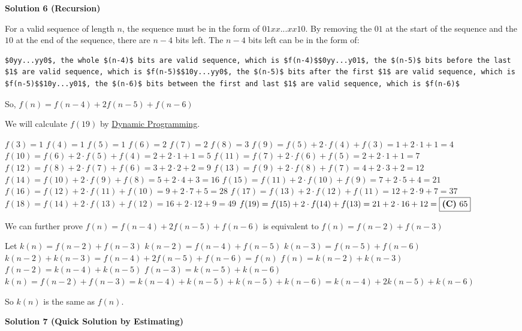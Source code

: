 \begin{enumerate}
\textbf{Solution 6 (Recursion)}

For a valid sequence of length $n$, the sequence must be in the form of $01xx...xx10$. By removing the $01$ at the start of the sequence and the $10$ at the end of the sequence, there are $n-4$ bits left. The $n-4$ bits left can be in the form of:

 \begin{verbatim}
$0yy...yy0$, the whole $(n-4)$ bits are valid sequence, which is $f(n-4)$$0yy...y01$, the $(n-5)$ bits before the last $1$ are valid sequence, which is $f(n-5)$$10y...yy0$, the $(n-5)$ bits after the first $1$ are valid sequence, which is $f(n-5)$$10y...y01$, the $(n-6)$ bits between the first and last $1$ are valid sequence, which is $f(n-6)$
\end{verbatim}

So, $f(n) = f(n-4) + 2f(n-5) + f(n-6)$

 We will calculate $f(19)$ by \href{https://en.wikipedia.org/wiki/Dynamic\_programming}{Dynamic Programming}.

 $f(3) = 1$
$f(4) = 1$
$f(5) = 1$
$f(6) = 2$
$f(7) = 2$
$f(8) = 3$
$f(9) = f(5) + 2 \cdot f(4) + f(3) = 1 + 2 \cdot 1 + 1 = 4$
$f(10) = f(6) + 2 \cdot f(5) + f(4) = 2 + 2 \cdot 1 + 1 = 5$
$f(11) = f(7) + 2 \cdot f(6) + f(5) = 2 + 2 \cdot 1 + 1 = 7$
$f(12) = f(8) + 2 \cdot f(7) + f(6) = 3 + 2 \cdot 2 + 2 = 9$
$f(13) = f(9) + 2 \cdot f(8) + f(7) = 4 + 2 \cdot 3 + 2 = 12$
$f(14) = f(10) + 2 \cdot f(9) + f(8) = 5 + 2 \cdot 4 + 3 = 16$
$f(15) = f(11) + 2 \cdot f(10) + f(9) = 7 + 2 \cdot 5 + 4 = 21$
$f(16) = f(12) + 2 \cdot f(11) + f(10) = 9 + 2 \cdot 7 + 5 = 28$
$f(17) = f(13) + 2 \cdot f(12) + f(11) = 12 + 2 \cdot 9 + 7 = 37$
$f(18) = f(14) + 2 \cdot f(13) + f(12) = 16 + 2 \cdot 12 + 9 = 49$
$f(19) = f(15) + 2 \cdot f(14) + f(13) = 21 + 2 \cdot 16 + 12 = \boxed{\text{\textbf{(C)}  } 65}$

 We can further prove $f(n) = f(n-4) + 2f(n-5) + f(n-6)$ is equivalent to $f(n) = f(n-2) + f(n-3)$

 Let $k(n) = f(n-2) + f(n-3)$
$k(n-2) = f(n-4) + f(n-5)$
$k(n-3) = f(n-5) + f(n-6)$
$k(n-2)+ k(n-3) = f(n-4) + 2f(n-5) + f(n-6) = f(n)$
$f(n) = k(n-2)+ k(n-3)$
$f(n-2) = k(n-4)+ k(n-5)$
$f(n-3) = k(n-5)+ k(n-6)$
$k(n) = f(n-2) + f(n-3) = k(n-4)+ k(n-5) + k(n-5)+ k(n-6) = k(n-4) + 2k(n-5) + k(n-6)$

 So $k(n)$ is the same as $f(n)$.

 



\textbf{Solution 7 (Quick Solution by Estimating)}


\end{enumerate}
